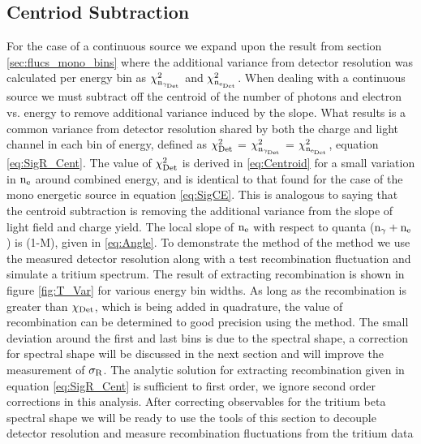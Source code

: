 

\subsection{Centriod Subtraction}
\label{sec:Centroid}
For the case of a continuous source we expand upon the result from section \ref{sec:flucs_mono_bins} where the additional variance from detector resolution was calculated per energy bin as $\rm \chi_{n_{\gamma_{Det}}}^2$ and $\rm \chi_{n_{e_{Det}}}^2$. When dealing with a continuous source we must subtract off the centroid of the number of photons and electron vs. energy to remove additional variance induced by the slope. What results is a common variance from detector resolution shared by both the charge and light channel in each bin of energy, defined as $\rm \chi_{Det}^2$ = $\rm \chi_{n_{\gamma_{Det}}}^2$ = $\rm \chi_{n_{e_{Det}}}^2$, equation \ref{eq:SigR_Cent}. The value of $\rm \chi_{Det}^2$ is derived in \ref{eq:Centroid} for a small variation in $\rm n_e$ around combined energy, and is identical to that found for the case of the mono energetic source in equation \ref{eq:SigCE}. This is analogous to saying that the centroid subtraction is removing the additional variance from the slope of light field and charge yield. The local slope of  $\rm n_e$ with respect to quanta ($\rm n_\gamma + n_e$) is (1-M), given in \ref{eq:Angle}. 
To demonstrate the method of the method we use the measured detector resolution along with a test recombination fluctuation and simulate a tritium spectrum. The result of extracting recombination is shown in figure \ref{fig:T_Var} for various energy bin widths. As long as the recombination is greater than $\rm \chi_{Det}$, which is being added in quadrature, the value of recombination can be determined to good precision using the method. The small deviation around the first and last bins is due to the spectral shape, a correction for spectral shape will be discussed in the next section and will improve the measurement of $\rm \sigma_R$. The analytic solution for extracting recombination given in equation \ref{eq:SigR_Cent} is sufficient to first order, we ignore second order corrections in this analysis. After correcting observables for the tritium beta spectral shape we will be ready to use the tools of this section to decouple detector resolution and measure recombination fluctuations from the tritium data

